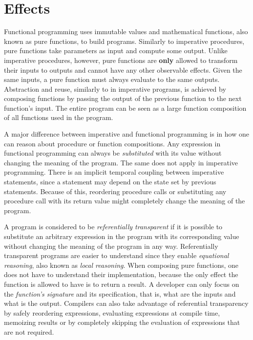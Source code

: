 \chapter{Effects} \label{Effects}

Functional programming uses immutable values and mathematical functions, also known as pure functions, to build programs. Similarly to imperative procedures, pure functions take parameters as input and compute some output. Unlike imperative procedures, however, pure functions are \textbf{only} allowed to transform their inputs to outputs and cannot have any other observable effects. Given the same inputs, a pure function must always evaluate to the same outputs. Abstraction and reuse, similarly to in imperative programs, is achieved by composing functions by passing the output of the previous function to the next function's input. The entire program can be seen as a large function composition of all functions used in the program.

A major difference between imperative and functional programming is in how one can reason about procedure or function compositions. Any expression in functional programming can always be \emph{substituted} with its value without changing the meaning of the program. The same does not apply in imperative programming. There is an implicit temporal coupling between imperative statements, since a statement may depend on the state set by previous statements. Because of this, reordering procedure calls or substituting any procedure call with its return value might completely change the meaning of the program.~\cite[Chapter~1]{sicp}

A program is considered to be \emph{referentially transparent} if it is possible to substitute an arbitrary expression in the program with its corresponding value without changing the meaning of the program in any way. Referentially transparent programs are easier to understand since they enable \emph{equational reasoning}, also known as \emph{local reasoning}. When composing pure functions, one does not have to understand their implementation, because the only effect the function is allowed to have is to return a result. A developer can only focus on the \emph{function's signature} and its specification, that is, what are the inputs and what is the output. Compilers can also take advantage of referential transparency by safely reordering expressions, evaluating expressions at compile time, memoizing results or by completely skipping the evaluation of expressions that are not required.

